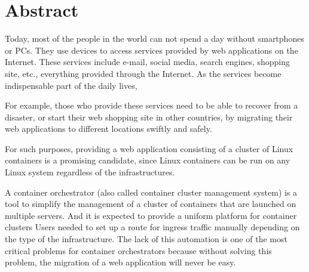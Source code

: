 \chapter*{Abstract}

Today, most of the people in the world can not spend a day without  smartphones or PCs.
They use  devices to access services provided by web applications on the Internet.
These services include e-mail, social media, search engines, shopping site, etc., everything provided through the Internet.
As the services become indispensable part of the daily lives, 

{ For example, those who provide these services need to be able to recover from a disaster, or start their web shopping site in other countries,
by migrating their web applications to different locations swiftly and safely.}

For such purposes, providing a web application consisting of a cluster of Linux containers is a promising candidate, since Linux containers can be run on any Linux system regardless of the infrastructures.

A container orchestrator (also called container cluster management system) is a tool to simplify the management of a cluster of containers that are launched on multiple servers.
And it is expected to provide a uniform platform for container clusters
Users needed to set up a route for ingress traffic manually depending on the type of the infrastructure.
The lack of this automation is one of the most critical problems for container orchestrators because without solving this problem, the migration of a web application will never be easy.

